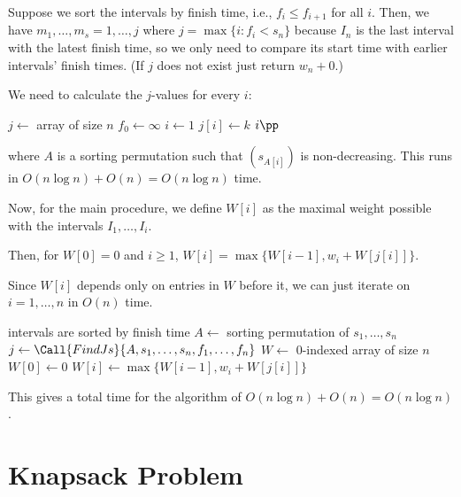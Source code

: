 Suppose we sort the intervals by finish time, i.e., $f_i \leq f_{i+1}$ for all $i$.
Then, we have $m_1,\dotsc,m_s = 1,\dotsc,j$ where $j = \max\{ i : f_i < s_n \}$
because $I_n$ is the last interval with the latest finish time,
so we only need to compare its start time with earlier intervals' finish times.
(If $j$ does not exist just return $w_n + 0$.)

We need to calculate the $j$-values for every $i$:
\begin{algorithm}[H]
  \caption{}
  \begin{algorithmic}[1]
    \State $j \gets$ array of size $n$
    \State $f_0 \gets \infty$
    \State $i \gets 1$
        \State $j[i] \gets k$
        \State $i\pp$
      \EndWhile
    \EndFor
    \State {}
  \end{algorithmic}
\end{algorithm}
where $A$ is a sorting permutation such that $(s_{A[i]})$ is non-decreasing.
This runs in $O(n\log n) + O(n) = O(n\log n)$ time.

Now, for the main procedure, we define $W[i]$ as the maximal weight
possible with the intervals $I_1,\dotsc,I_i$.

Then, for $W[0] = 0$ and $i \geq 1$, $W[i] = \max\{W[i-1], w_i + W[j[i]]\}$.

Since $W[i]$ depends only on entries in $W$ before it,
we can just iterate on $i = 1,\dotsc,n$ in $O(n)$ time.

\begin{algorithm}[H]
  \caption{}
  \begin{algorithmic}[1]
    \Require intervals are sorted by finish time
    \State $A \gets$ sorting permutation of $s_1,\dotsc,s_n$
    \State $j \gets \Call{FindJs}{A,s_1,\dotsc,s_n,f_1,\dotsc,f_n}$
    \State $W \gets$ 0-indexed array of size $n$
    \State $W[0] \gets 0$
      \State $W[i] \gets \max\{W[i-1], w_i + W[j[i]]\}$
    \EndFor
    \State {}
  \end{algorithmic}
\end{algorithm}

This gives a total time for the algorithm of $O(n\log n) + O(n) = O(n\log n)$.

\section{Knapsack Problem}


